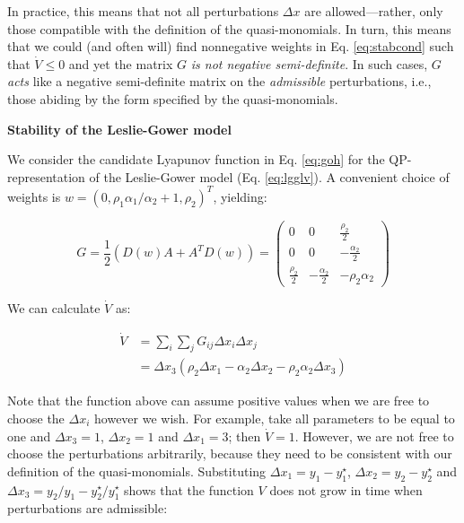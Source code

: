 \documentclass{article}
\begin{document}
In practice, this means that not all perturbations \(\Delta x\) are
allowed---rather, only those compatible with the definition of the
quasi-monomials. In turn, this means that we could (and often will) find
nonnegative weights in Eq. \ref{eq:stabcond} such that
\(\dot{V} \leq 0\) and yet the matrix \(G\) \emph{is not negative
semi-definite}. In such cases, \(G\) \emph{acts} like a negative
semi-definite matrix on the \emph{admissible} perturbations, i.e., those
abiding by the form specified by the quasi-monomials.

\begin{cb}
\textbf{Stability of the Leslie-Gower model}

We consider the candidate Lyapunov function in Eq. \ref{eq:goh} for the QP-representation of the Leslie-Gower model (Eq. \ref{eq:lgglv}). A convenient choice of weights is $w = (0, \rho_1 \alpha_1 / \alpha_2 + 1, \rho_2)^T$, yielding:

\begin{equation}
G =\frac{1}{2} (D(w)A + A^T D(w)) =
\begin{pmatrix}
0 & 0 & \frac{\rho_2}{2} \\
0 & 0 & -\frac{\alpha_2}{2} \\
\frac{\rho_2}{2} & -\frac{\alpha_2}{2} & -\rho_2 \alpha_2
\end{pmatrix}
\end{equation}

We can calculate $\dot{V}$ as:

\begin{equation}
\begin{aligned}
\dot{V} &= \sum_i \sum_j G_{ij} \Delta x_i \Delta x_j\\
&= \Delta x_3 (\rho_2 \Delta x_1 - \alpha_2 \Delta x_2 - \rho_2 \alpha_2 \Delta x_3)
\end{aligned}
\end{equation}

Note that the function above can assume positive values when we are free to choose the $\Delta x_i$ however we wish. For example, take all parameters to be equal to one and $\Delta x_3 = 1$, $\Delta x_2 = 1$ and $\Delta x_1 = 3$; then $\dot{V} = 1$. However, we are not free to choose the perturbations arbitrarily, because they need to be consistent with our definition of the quasi-monomials. Substituting $\Delta x_1 = y_1 - y_1^\star$, $\Delta x_2 = y_2 - y_2^\star$ and $\Delta x_3 = y_2/y_1 - y_2^\star / y_1^\star$ shows that the function $V$ does not grow in time when perturbations are admissible:


\end{cb}
\end{document}
